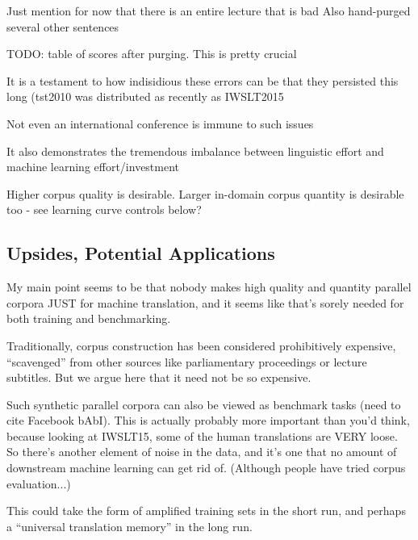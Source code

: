 Just mention for now that there is an entire lecture that is bad
Also hand-purged several other sentences

TODO: table of scores after purging. This is pretty crucial





It is a testament to how indisidious these errors can be that they persisted this long (tst2010 was distributed as recently as IWSLT2015

Not even an international conference is immune to such issues

It also demonstrates the tremendous imbalance between linguistic effort and machine learning effort/investment




Higher corpus quality is desirable.
Larger in-domain corpus quantity is desirable too - see learning curve controls below?


\subsection{Upsides, Potential Applications}


My main point seems to be that nobody makes high quality and quantity parallel corpora JUST for machine translation, and it seems like that's sorely needed for both training and benchmarking.

Traditionally, corpus construction has been considered prohibitively expensive, ``scavenged'' from other sources like parliamentary proceedings or lecture subtitles.
But we argue here that it need not be so expensive.

Such synthetic parallel corpora can also be viewed as benchmark tasks (need to cite Facebook bAbI).
This is actually probably more important than you'd think, because looking at IWSLT15, some of the human translations are VERY loose.
So there's another element of noise in the data, and it's one that no amount of downstream machine learning can get rid of.
(Although people have tried corpus evaluation...)





This could take the form of amplified training sets in the short run, and perhaps a ``universal translation memory'' in the long run.

